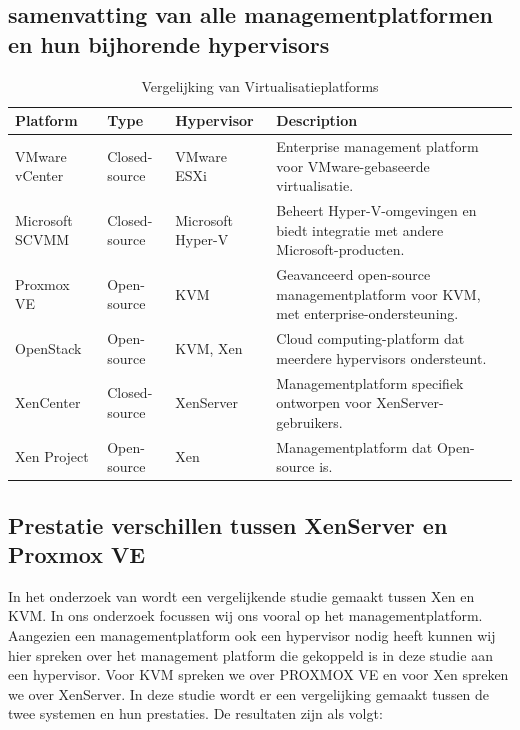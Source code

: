 \subsection{samenvatting van alle managementplatformen en hun bijhorende hypervisors}
    \begin{table}[h!]
        \centering
        \begin{tabular}{|l|l|l|l|}
        \hline
        \textbf{Platform}      & \textbf{Type}      & \textbf{Hypervisor} & \textbf{Description} \\ \hline
        VMware vCenter         & Closed-source      & VMware ESXi         & Enterprise management platform voor VMware-gebaseerde virtualisatie. \\ \hline
        Microsoft SCVMM        & Closed-source      & Microsoft Hyper-V   & Beheert Hyper-V-omgevingen en biedt integratie met andere Microsoft-producten. \\ \hline
        Proxmox VE             & Open-source        & KVM                 & Geavanceerd open-source managementplatform voor KVM, met enterprise-ondersteuning. \\ \hline
        OpenStack              & Open-source        & KVM, Xen            & Cloud computing-platform dat meerdere hypervisors ondersteunt. \\ \hline
        XenCenter              & Closed-source      & XenServer           & Managementplatform specifiek ontworpen voor XenServer-gebruikers. \\ \hline
        Xen Project            & Open-source        & Xen                 & Managementplatform dat Open-source is. \\ \hline
        \end{tabular}
        \caption{Vergelijking van Virtualisatieplatforms}
        \end{table}
        
\subsection{Prestatie verschillen tussen XenServer en Proxmox VE}
In het onderzoek van \textcite{algarni2018performance} wordt een vergelijkende studie gemaakt tussen Xen en KVM. In ons onderzoek focussen wij ons vooral op het managementplatform.
Aangezien een managementplatform ook een hypervisor nodig heeft kunnen wij hier spreken over het management platform die gekoppeld is in deze studie aan een hypervisor.
Voor KVM spreken we over PROXMOX VE en voor Xen spreken we over XenServer. In deze studie wordt er een vergelijking gemaakt tussen de twee systemen en hun prestaties. De resultaten zijn als volgt:

